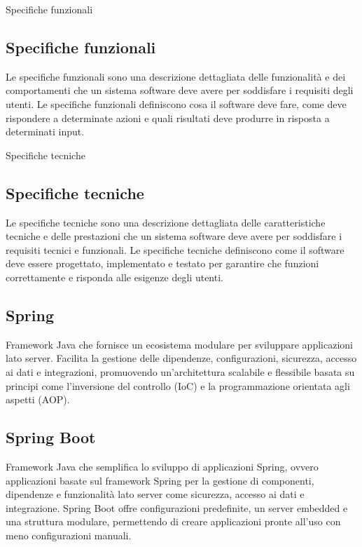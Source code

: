 \hypertarget{sec:specifiche_funzionali}{Specifiche funzionali}
\subsection*{Specifiche funzionali}
Le specifiche funzionali sono una descrizione dettagliata delle funzionalità e dei comportamenti che un sistema software deve avere per soddisfare i 
requisiti degli utenti. Le specifiche funzionali definiscono cosa il software deve fare, come deve rispondere a determinate azioni e quali risultati
deve produrre in risposta a determinati input.

\hypertarget{sec:specifiche_tecniche}{Specifiche tecniche}
\subsection*{Specifiche tecniche}
Le specifiche tecniche sono una descrizione dettagliata delle caratteristiche tecniche e delle prestazioni che un sistema software deve avere per
soddisfare i requisiti tecnici e funzionali. Le specifiche tecniche definiscono come il software deve essere progettato, implementato e testato per
garantire che funzioni correttamente e risponda alle esigenze degli utenti.

\hypertarget{sec:spring}{}
\subsection*{Spring}
Framework Java che fornisce un ecosistema modulare per sviluppare applicazioni lato server. Facilita la gestione delle dipendenze, configurazioni, 
sicurezza, accesso ai dati e integrazioni, promuovendo un'architettura scalabile e flessibile basata su principi come l'inversione del controllo (IoC) e 
la programmazione orientata agli aspetti (AOP).

\hypertarget{sec:spring_boot}{}
\subsection*{Spring Boot}
Framework Java che semplifica lo sviluppo di applicazioni Spring, ovvero applicazioni basate sul framework Spring per la gestione di componenti, dipendenze 
e funzionalità lato server come sicurezza, accesso ai dati e integrazione. Spring Boot offre configurazioni predefinite, un server embedded e una struttura 
modulare, permettendo di creare applicazioni pronte all'uso con meno configurazioni manuali.

\hypertarget{sec:SonarQube for IDE}{}
